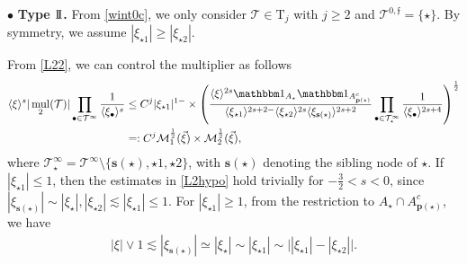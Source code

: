 \documentclass[a4paper,
11pt,  reqno]{amsart}
\newcommand{\II}{\textup{I \hspace{-2.9mm} I} }
\newcommand{\5}{\textup{V}}
\newcommand{\noi}{\noindent}
\newcommand{\ind}{\mathbbm 1}
\newcommand{\les}{\lesssim}
\theoremstyle{remark}
\newcommand{\bul}{\bullet}
\newcommand{\TT}{\mathcal{T}}
\newcommand{\Tr}{\mathrm{T}}
\newcommand{\pb}{\mathbf{p}}
\newcommand{\sbf}{\mathbf{s}}
\newcommand{\jb}[1]
{\langle #1 \rangle}
\newcommand{\ff}{\mathfrak{f}}
\newcommand{\M}{\mathcal{M}}
\DeclareMathOperator{\mul}{mul}
\numberwithin{equation}{section}
\numberwithin{theorem}{section}
\begin{document}
\noi
$\bul$ \textbf{Type $\II$.}
From \eqref{wint0c}, we only consider $\TT\in \Tr_j$ with $j\ge 2$ and $\TT^{0,\ff} = \{\star\}$. By symmetry, we assume $|\xi_{\star1}| \ge |\xi_{\star2}|$.
{
From \eqref{L22}, we can control the multiplier as follows
\begin{align}\label{L22_1}
\jb{\xi}^s |\mul_2(\TT)|  \prod_{\bul \in \TT^\infty} \frac{1}{\jb{\xi_\bul}^s}
&
\le
C^j
|\xi_{\star1}|^{1-}
\times
\left(\frac{\jb{\xi}^{2s} \ind_{A_\star} \ind_{A^c_{\pb(\star)}} }{ \jb{\xi_{\star1}}^{2s+2-} \jb{\xi_{\star2}}^{2s}  \jb{\xi_{\sbf(\star)}}^{2s+2} } \prod_{\bul \in \TT^{\infty}_\star} \frac{1}{\jb{\xi_{\bul}}^{2s+4}}\right)^{\frac12}
\\
&
=:
C^j
\mathcal{M}_1^{\frac12} (\vec\xi)
\times
\M_2^\frac12 (\vec\xi)
,
\end{align}
where $\TT^\infty_\star = \TT^\infty \setminus \{\sbf(\star), \star1, \star2\}$, with $\sbf(\star)$ denoting the sibling node of $\star$. If $|\xi_{\star1}| \le 1$, then the estimates in \eqref{L2hypo} hold trivially for $-\frac32<s<0$, since $|\xi_{\sbf(\star)}| \sim |\xi_{\star}| , |\xi_{\star2}| \les |\xi_{\star1}| \le 1 $. For $|\xi_{\star1}| \ge 1$, from the restriction to $A_\star \cap A_{\pb(\star)}^c$, we have
\begin{align}
|\xi| \lor 1
 \les   |\xi_{\sbf(\star)}| \simeq |\xi_{\star}|
\sim
|\xi_{\star1}|
\sim
\big| |\xi_{\star1} | - |\xi_{\star2}| \big|
.
\end{align}





}
\end{document}
